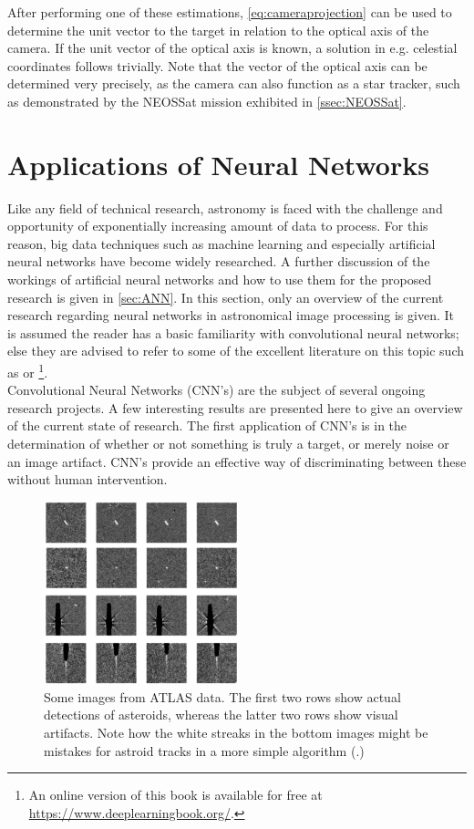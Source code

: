 After performing one of these estimations, \autoref{eq:cameraprojection} can be used to determine the unit vector to the target in relation to the optical axis of the camera. If the unit vector of the optical axis is known, a solution in e.g. celestial coordinates follows trivially. Note that the vector of the optical axis can be determined very precisely, as the camera can also function as a star tracker, such as demonstrated by the NEOSSat mission exhibited in \autoref{ssec:NEOSSat}.

\section{Applications of Neural Networks}

Like any field of technical research, astronomy is faced with the challenge and opportunity of exponentially increasing amount of data to process. For this reason, big data techniques such as machine learning and especially artificial neural networks have become widely researched. A further discussion of the workings of artificial neural networks and how to use them for the proposed research is given in \autoref{sec:ANN}. In this section, only an overview of the current research regarding neural networks in astronomical image processing is given. It is assumed the reader has a basic familiarity with convolutional neural networks; else they are advised to refer to some of the excellent literature on this topic such as \cite{nnbooktwo} or \cite{nnbookfour}\footnote{An online version of this book is available for free at \url{https://www.deeplearningbook.org/}.}.\\

Convolutional Neural Networks (CNN's) are the subject of several ongoing research projects. A few interesting results are presented here to give an overview of the current state of research. The first application of CNN's is in the determination of whether or not something is truly a target, or merely noise or an image artifact. CNN's provide an effective way of discriminating between these without human intervention.\\

\begin{figure}[htbp]
    \centering
    \includegraphics[width=0.5\textwidth]{images/atlascnn.png}
    \caption{Some images from ATLAS data. The first two rows show actual detections of asteroids, whereas the latter two rows show visual artifacts. Note how the white streaks in the bottom images might be mistakes for astroid tracks in a more simple algorithm (\cite{AtlasDL}.)}
    \label{fig:AtlasCNN}
\end{figure}

